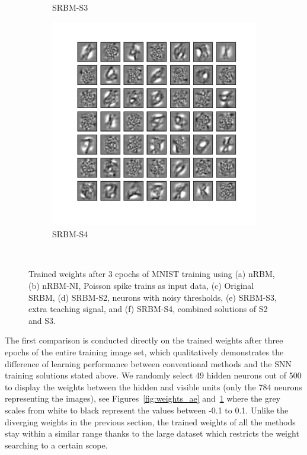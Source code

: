 \begin{figure}
\begin{subfigure}[t]{0.4\textwidth}
		\caption{SRBM-S3}
	\end{subfigure}
	\begin{subfigure}[t]{0.4\textwidth}
		\includegraphics[width=\textwidth]{pics_sdlm/53_MNIST_SRBM_all/2_60000_0.pdf}
		\caption{SRBM-S4}
	\end{subfigure}\\
	\caption[Comparisons of trained weights using (spiking) RBMs.]{Trained weights after 3 epochs of MNIST training using (a) nRBM, (b) nRBM-NI, Poisson spike trains as input data, (c) Original SRBM, (d) SRBM-S2, neurons with noisy thresholds, (e) SRBM-S3, extra teaching signal, and (f) SRBM-S4, combined solutions of S2 and S3.}
	\label{fig:weights_rbm}
\end{figure}

The first comparison is conducted directly on the trained weights after three epochs of the entire training image set, which qualitatively demonstrates the difference of learning performance between conventional methods and the SNN training solutions stated above.
We randomly select 49 hidden neurons out of 500 to display the weights between the hidden and visible units (only the 784 neurons representing the images), see Figures~\ref{fig:weights_ae} and~\ref{fig:weights_rbm} where the grey scales from white to black represent the values between -0.1 to 0.1.
Unlike the diverging weights in the previous section, the trained weights of all the methods stay within a similar range thanks to the large dataset which restricts the weight searching to a certain scope.  



